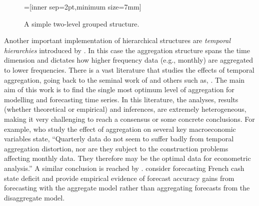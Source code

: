 \documentclass[graybox]{svmult}
\begin{document}
\begin{figure}[!hbt]
\center
{}=[inner sep=2pt,minimum size=7mm]
  \caption{A simple two-level grouped structure.}
  \label{fig:simple grouped tree}
\end{figure}

Another important implementation of hierarchical structures are \textit{temporal hierarchies} introduced by \cite{AthEtAl2017}. In this case the aggregation structure spans the time dimension and dictates how higher frequency data (e.g., monthly) are aggregated to lower frequencies. There is a vast literature that studies the effects of temporal aggregation, going back to the seminal work of \cite{ZelMon1971, AmeWu1972, Tia1972, Bre1973} and others such as, \cite{Hot1993, HotCar1993, Mar1999, SilEtAl2008}. The main aim of this work is to find the single most optimum level of aggregation for modelling and forecasting time series. In this literature, the analyses, results (whether theoretical or empirical) and inferences, are extremely heterogeneous, making it very challenging to reach a consensus or some concrete conclusions. For example, \cite{RosSea1995} who study the effect of aggregation on several key macroeconomic variables state, ``Quarterly data do not seem to suffer badly from temporal aggregation distortion, nor are they subject to the construction problems affecting monthly data. They therefore may be the optimal data for econometric analysis.'' A similar conclusion is reached by \cite{NijPal1990}. \cite{SilEtAl2008} consider forecasting French cash state deficit and provide empirical evidence of forecast accuracy gains from forecasting with the aggregate model rather than aggregating forecasts from the disaggregate model.
\end{document}
